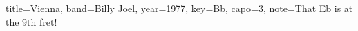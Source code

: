 \documentclass{skrul-leadsheet}
\begin{document}
\begin{song}[transpose-capo=true]{title={Vienna}, band={Billy Joel}, year={1977}, key={Bb}, capo={3}, note={That Eb is at the 9th fret!}}



\end{song}
\end{document}
